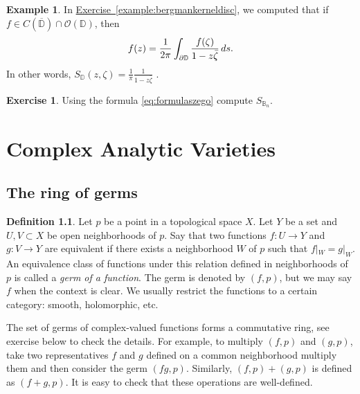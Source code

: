 \documentclass[12pt,openany]{book}
\newcommand{\avoidbreak}{\postdisplaypenalty=100}
\newcommand{\D}{{\mathbb{D}}}
\newcommand{\bB}{{\mathbb{B}}}
\newcommand{\sO}{{\mathscr{O}}}
\newcommand{\myindex}[1]{#1\index{#1}}
\theoremstyle{plain}
\theoremstyle{remark}
\theoremstyle{definition}
\newtheorem{defn}[thm]{Definition}
\newenvironment{exbox}{%
    \def\FrameCommand{\vrule width 1pt \relax\hspace{10pt}}%
    \MakeFramed{\advance\hsize-\width\FrameRestore}%
}{%
    \endMakeFramed
}
\theoremstyle{exercise}
\newtheorem{exercise}{Exercise}[section]
\theoremstyle{example}
\newtheorem{example}[thm]{Example}
\newcommand{\exerciseref}[1]{\hyperref[#1]{Exercise~\ref*{#1}}}
\begin{document}
\begin{example}
In \exerciseref{example:bergmankerneldisc}, we computed that
if $f \in C(\overline{\D}) \cap \sO(\D)$, then
\begin{equation*}
f(z) = \frac{1}{2\pi} \int_{\partial \D} \frac{f(\zeta)}{1-z\bar{\zeta}} \, ds .
\avoidbreak
\end{equation*}
In other words, $S_{\D}(z,\zeta) =
\frac{1}{\pi}
\frac{1}{1-z\bar{\zeta}}$ .
\end{example}

\begin{exbox}
\begin{exercise}
Using the formula \eqref{eq:formulaszego} compute $S_{\bB_n}$.
\end{exercise}
\end{exbox}


\chapter{Complex Analytic Varieties} \label{ch:analyticvarieties}


\section{The ring of germs}

\begin{defn}
Let $p$ be a point in a topological space $X$.  Let $Y$ be a set and
$U, V \subset X$ be open neighborhoods of $p$.  Say that
two functions $f \colon U \to Y$ and
$g \colon V \to Y$ are equivalent if there exists a neighborhood
$W$ of $p$ such that $f|_W = g|_W$.
An equivalence class of functions under this relation defined in neighborhoods of $p$
is called a \emph{\myindex{germ of a function}}.
%
The germ is denoted by $(f,p)$, but we may say $f$ when
the context is clear.
We usually restrict the functions to a certain category:
smooth, holomorphic, etc.
\end{defn}

The set of germs of complex-valued functions forms a
commutative ring, see exercise below to check the details.
For example, to multiply $(f,p)$ and $(g,p)$, take two representatives
$f$ and $g$ defined on a common neighborhood multiply them and
then consider the germ $(fg,p)$.  Similarly, $(f,p) + (g,p)$ is
defined as $(f+g,p)$.  It is easy to check that these operations are
well-defined.
\end{document}

